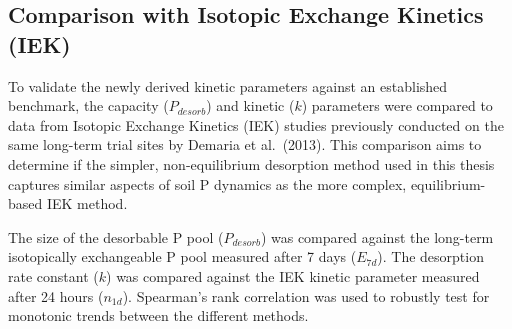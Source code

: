 \documentclass[
  a4paper,
]{article}
\begin{document}
\subsection{Comparison with Isotopic Exchange Kinetics
(IEK)}\label{comparison-with-isotopic-exchange-kinetics-iek}

To validate the newly derived kinetic parameters against an established
benchmark, the capacity (\(P_{desorb}\)) and kinetic (\(k\)) parameters
were compared to data from Isotopic Exchange Kinetics (IEK) studies
previously conducted on the same long-term trial sites by Demaria et
al.~(2013). This comparison aims to determine if the simpler,
non-equilibrium desorption method used in this thesis captures similar
aspects of soil P dynamics as the more complex, equilibrium-based IEK
method.

The size of the desorbable P pool (\(P_{desorb}\)) was compared against
the long-term isotopically exchangeable P pool measured after 7 days
(\(E_{7d}\)). The desorption rate constant (\(k\)) was compared against
the IEK kinetic parameter measured after 24 hours (\(n_{1d}\)).
Spearman's rank correlation was used to robustly test for monotonic
trends between the different methods.
\end{document}

